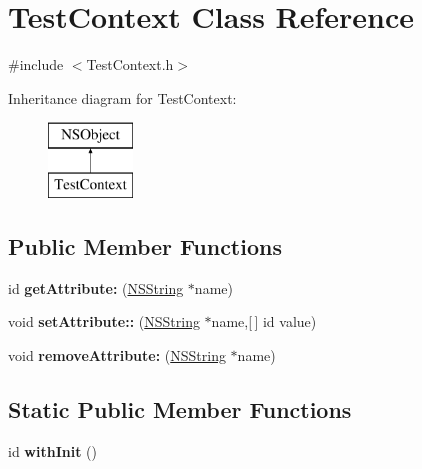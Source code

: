 \hypertarget{interface_test_context}{
\section{\-Test\-Context \-Class \-Reference}
\label{interface_test_context}
}


{\ttfamily \#include $<$\-Test\-Context.\-h$>$}

\-Inheritance diagram for \-Test\-Context\-:\begin{figure}[H]
\begin{center}
\leavevmode
\includegraphics[height=2.000000cm]{interface_test_context}
\end{center}
\end{figure}
\subsection*{\-Public \-Member \-Functions}
\begin{DoxyCompactItemize}
\item 
\hypertarget{interface_test_context_a278c4b78ecead967d806a29d6e39acad}{
id {\bfseries get\-Attribute\-:} (\hyperlink{class_n_s_string}{\-N\-S\-String} $\ast$name)}
\label{interface_test_context_a278c4b78ecead967d806a29d6e39acad}

\item 
\hypertarget{interface_test_context_a89e652dbd1543804e1fdc41e5ef2f010}{
void {\bfseries set\-Attribute\-::} (\hyperlink{class_n_s_string}{\-N\-S\-String} $\ast$name,\mbox{[}$\,$\mbox{]} id value)}
\label{interface_test_context_a89e652dbd1543804e1fdc41e5ef2f010}

\item 
\hypertarget{interface_test_context_afba71cc3017f86d34557464944625a90}{
void {\bfseries remove\-Attribute\-:} (\hyperlink{class_n_s_string}{\-N\-S\-String} $\ast$name)}
\label{interface_test_context_afba71cc3017f86d34557464944625a90}

\end{DoxyCompactItemize}
\subsection*{\-Static \-Public \-Member \-Functions}
\begin{DoxyCompactItemize}
\item 
\hypertarget{interface_test_context_a9c0debca8e7e32492502399ce3cdc6bf}{
id {\bfseries with\-Init} ()}
\label{interface_test_context_a9c0debca8e7e32492502399ce3cdc6bf}

\end{DoxyCompactItemize}


